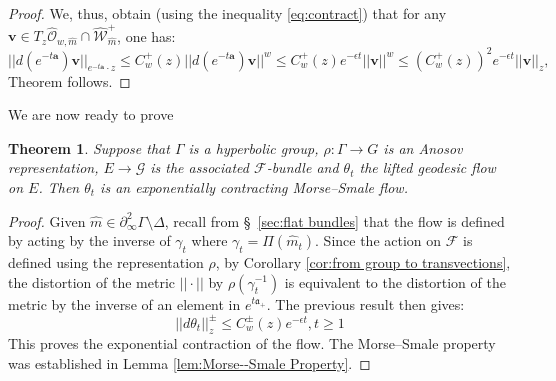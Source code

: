\documentclass[12pt]{amsbook}%
\newtheorem{thm}{Theorem}[chapter]
\newtheorem{lem}[thm]{Lemma}
\theoremstyle{definition}
\theoremstyle{remark}
\numberwithin{section}{chapter}
\numberwithin{subsection}{section}
\numberwithin{figure}{chapter}
\def\eps{\epsilon}
\def\cF{{\mathscr{F}}}
\def\cO{{\mathscr{O}}}
\def\cW{{\mathscr{W}}}
\def\ba{\mathbf{a}}
\def\bv{\mathbf{v}}
\def\Ga{\Gamma}
\def\cG{{\mathscr{G}}}
\begin{document}
{{\begin{proof}
We, thus, obtain (using the inequality \eqref{eq:contract}) that for any $\bv \in T_z \hat{\cO}_{w,\hat{m}} \cap \hat{\cW}^+_{\hat{m}}$, one has:
\begin{equation*}
|| d (e^{-t \ba}) \bv ||_{e^{-t  \ba } \cdot z} \leqslant C_w^+(z) || d (e^{-t \ba}) \bv ||^w \leqslant C_w^+(z) e^{-\epsilon t} ||\bv ||^w \leqslant (C_{w}^+(z))^2 e^{-\epsilon t} ||\bv ||_{z}, 
\end{equation*}
Theorem follows. \end{proof}

We are now ready to prove

\begin{thm}\label{thm:main-C}
Suppose that $\Ga$ is a hyperbolic group, $\rho: \Ga\to G$ is an Anosov representation, $E\to \cG$ is the associated $\cF$-bundle and $\theta_t$ the lifted 
geodesic flow on $E$. Then $\theta_t$ is an exponentially contracting Morse--Smale flow.   
\end{thm} 
\begin{proof} 

Given $\hat{m} \in \partial^2_\infty \Ga \setminus \Delta$, recall from \S~\ref{sec:flat bundles} that the flow is defined by acting by the inverse of $\gamma_t$ where $\gamma_t = \Pi(\hat{m}_t)$. Since the action on $\cF$ is defined using the representation $\rho$, by Corollary \ref{cor:from group to transvections}, the distortion of the metric $|| \cdot ||$ by $\rho(\gamma_t^{-1})$ is equivalent to the distortion of the metric by the inverse of an element in $e^{t \mathfrak{a}_+}$. The previous result then gives:
$$
||d\theta_t||^{\pm}_z\leqslant C_w^{\pm}(z) e^{-\eps t}, t\geqslant 1
$$
This proves the exponential contraction of the flow. 
The Morse--Smale property was established in Lemma 
\ref{lem:Morse--Smale Property}. %
\end{proof}


}}
\end{document}
